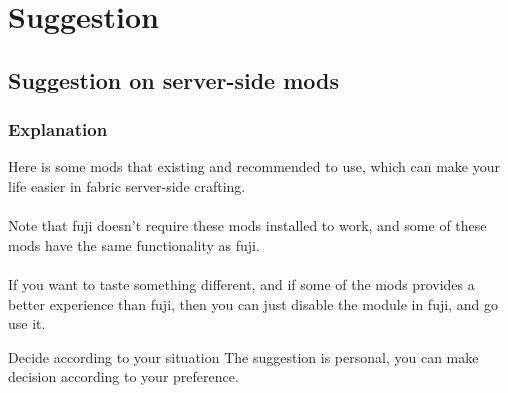 \chapter{Suggestion}\label{ch:suggestion}


\section{Suggestion on server-side mods}

\subsection{Explanation}
Here is some mods that existing and recommended to use, which can make your life easier in fabric server-side crafting.\\
\\
Note that fuji doesn't require these mods installed to work, and some of these mods have the same functionality as fuji.\\
\\
If you want to taste something different, and if some of the mods provides a better experience than fuji, then you can just disable the module in fuji, and go use it.

\begin{tips}{Decide according to your situation}
    The suggestion is personal, you can make decision according to your preference.
\end{tips}

\clearpage

